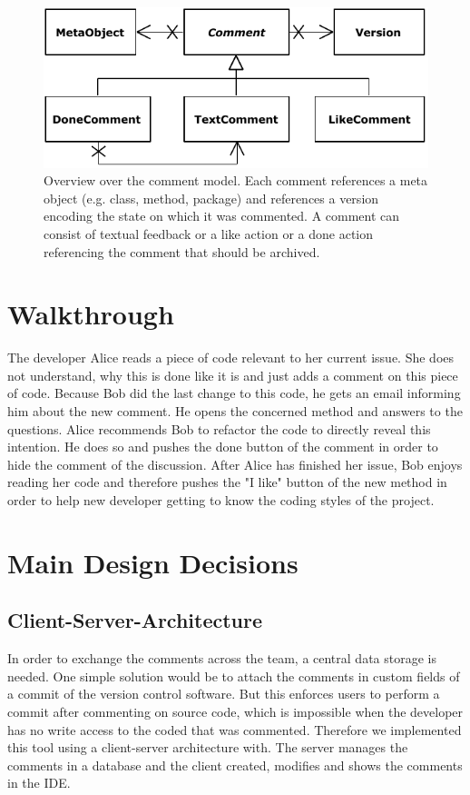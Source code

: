 \documentclass[10pt, conference]{IEEEtran}
\begin{document}
\begin{figure}[t!]
\includegraphics[width=\columnwidth]{images/Overview.pdf}
\caption{Overview over the comment model. Each comment references a meta object (e.g. class, method, package) and references a version encoding the state on which it was commented. A comment can consist of textual feedback or a like action or a done action referencing the comment that should be archived.}
\label{overview}
\end{figure}
\section{Walkthrough}
The developer Alice reads a piece of code relevant to her current issue.
%
She does not understand, why this is done like it is and just adds a comment on this piece of code. 
%
Because Bob did the last change to this code, he gets an email informing him about the new comment. 
%
He opens the concerned method and answers to the questions. 
%
Alice recommends Bob to refactor the code to directly reveal this intention.
%
He does so and pushes the done button of the comment in order to hide the comment of the discussion. 
%
After Alice has finished her issue, Bob enjoys reading her code and therefore pushes the "I like" button of the new method in order to help new developer getting to know the coding styles of the project. 

\section{Main Design Decisions}

\subsection{Client-Server-Architecture}
In order to exchange the comments across the team, a central data storage is needed. 
%
One simple solution would be to attach the comments in custom fields of a commit of the version control software. 
%
But this enforces users to perform a commit after commenting on source code, which is impossible when the developer has no write access to the coded that was commented. 
%
Therefore we implemented this tool using a client-server architecture with. 
%
The server manages the comments in a database and the client created, modifies and shows the comments in the IDE. 
\end{document}
